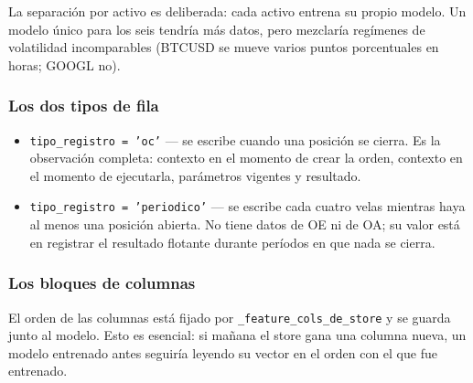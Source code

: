 \documentclass[11pt,a4paper]{article}
\newcommand{\code}[1]{\texttt{\small #1}}
\newcommand{\bigsep}{\par\vspace{3pt}}
\begin{document}
\bigsep
La separación por activo es deliberada: cada activo entrena su propio modelo. Un modelo
único para los seis tendría más datos, pero mezclaría regímenes de volatilidad
incomparables (BTCUSD se mueve varios puntos porcentuales en horas; GOOGL no).

\subsubsection{Los dos tipos de fila}

\begin{itemize}[leftmargin=1.4em,itemsep=3pt]
\item \code{tipo_registro = 'oc'} — se escribe cuando una posición se cierra. Es la
observación completa: contexto en el momento de crear la orden, contexto en el momento de
ejecutarla, parámetros vigentes y resultado.
\item \code{tipo_registro = 'periodico'} — se escribe cada cuatro velas mientras haya al
menos una posición abierta. No tiene datos de OE ni de OA; su valor está en registrar el
resultado flotante durante períodos en que nada se cierra.
\end{itemize}

\subsubsection{Los bloques de columnas}

El orden de las columnas está fijado por \code{_feature_cols_de_store} y se guarda junto al
modelo. Esto es esencial: si mañana el store gana una columna nueva, un modelo entrenado
antes seguiría leyendo su vector en el orden con el que fue entrenado.
\end{document}
